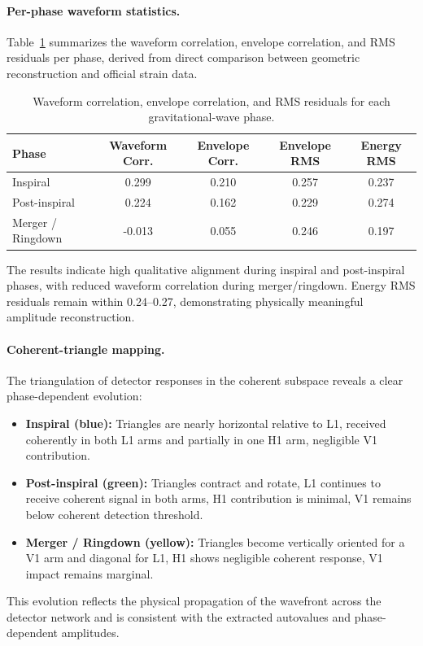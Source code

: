 \documentclass[11pt,a4paper]{article}
\begin{document}
\paragraph{Per-phase waveform statistics.}
Table~\ref{tab:phase_statistics} summarizes the waveform correlation, envelope correlation, and RMS residuals per phase, derived from direct comparison between geometric reconstruction and official strain data.

\begin{table}[H]
\centering
\caption{Waveform correlation, envelope correlation, and RMS residuals for each gravitational-wave phase.}
\label{tab:phase_statistics}
\begin{tabular}{lcccc}
\toprule
Phase & Waveform Corr. & Envelope Corr. & Envelope RMS & Energy RMS \\
\midrule
Inspiral & 0.299 & 0.210 & 0.257 & 0.237 \\
Post-inspiral & 0.224 & 0.162 & 0.229 & 0.274 \\
Merger / Ringdown & -0.013 & 0.055 & 0.246 & 0.197 \\
\bottomrule
\end{tabular}
\end{table}

The results indicate high qualitative alignment during inspiral and post-inspiral phases, with reduced waveform correlation during merger/ringdown. Energy RMS residuals remain within 0.24–0.27, demonstrating physically meaningful amplitude reconstruction.

\paragraph{Coherent-triangle mapping.}
The triangulation of detector responses in the coherent subspace reveals a clear phase-dependent evolution:
\begin{itemize}
    \item \textbf{Inspiral (blue):} Triangles are nearly horizontal relative to L1, received coherently in both L1 arms and partially in one H1 arm, negligible V1 contribution.
    \item \textbf{Post-inspiral (green):} Triangles contract and rotate, L1 continues to receive coherent signal in both arms, H1 contribution is minimal, V1 remains below coherent detection threshold.
    \item \textbf{Merger / Ringdown (yellow):} Triangles become vertically oriented for a V1 arm and diagonal for L1, H1 shows negligible coherent response, V1 impact remains marginal.
\end{itemize}
This evolution reflects the physical propagation of the wavefront across the detector network and is consistent with the extracted autovalues and phase-dependent amplitudes.
\end{document}
